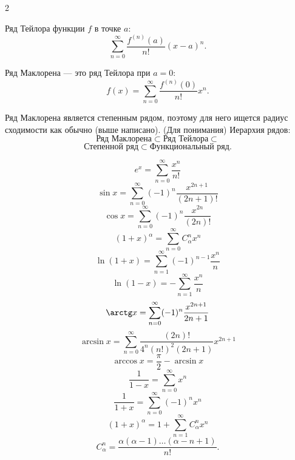 \begin{multicols}{2}
\begin{definition}
    Ряд Тейлора функции $f$ в точке $a$:
    \[
        \sum_{n=0}^{\infty}
        \frac{f^{(n)}(a)}{n!}(x-a)^n.
    \]
\end{definition}


\begin{definition}
    Ряд Маклорена --- это ряд Тейлора при $a = 0$:
    \[
        f(x)
        =
        \sum_{n=0}^{\infty}
        \frac{f^{(n)}(0)}{n!}x^n.
    \]
\end{definition}

\begin{remark}
    Ряд Маклорена является степенным рядом, поэтому для него ищется радиус сходимости как обычно (выше написано).
    (Для понимания) Иерархия рядов:
    \[
        \text{Ряд Маклорена}
        \subset
        \text{Ряд Тейлора} \subset
    \]
    \[
        \text{Степенной ряд}
        \subset
        \text{Функциональный ряд}.
    \]
\end{remark}

\begin{hint}
    \[
        e^x = \sum_{n=0}^{\infty} \frac{x^n}{n!}
    \]
    \[
        \sin x = \sum_{n=0}^{\infty} (-1)^n \frac{x^{2n+1}}{(2n+1)!}
    \]
    \[
        \cos x = \sum_{n=0}^{\infty} (-1)^n \frac{x^{2n}}{(2n)!}
    \]
    \[
        (1+x)^{\alpha}
        =
        \sum_{n=0}^{\infty}
        C_{\alpha}^{n}x^n
    \]
    \[
        \ln(1+x)
        =
        \sum_{n=1}^{\infty}
        (-1)^{n-1}\frac{x^n}{n}
    \]
    \[
        \ln(1-x)
        =
        -\sum_{n=1}^{\infty}
        \frac{x^n}{n}
    \]
    \[
        \arctg x
        =
        \sum_{n=0}^{\infty}
        (-1)^n\frac{x^{2n+1}}{2n+1}
    \]
    \[
        \arcsin x
        =
        \sum_{n=0}^{\infty}
        \frac{(2n)!}{4^n(n!)^2(2n+1)}x^{2n+1}
    \]
    \[
        \arccos x = \frac{\pi}{2} - \arcsin x
    \]
    \[
        \frac{1}{1-x}
        =
        \sum_{n=0}^{\infty}x^n
    \]
    \[
        \frac{1}{1+x}
        =
        \sum_{n=0}^{\infty}(-1)^n x^n
    \]
    \[
        (1+x)^{\alpha}
        =
        1 + \sum_{n=1}^{\infty} C_{\alpha}^{n}x^n
    \]
    \[
        C_{\alpha}^{n}
        =
        \frac{\alpha(\alpha-1)\ldots(\alpha-n+1)}{n!}.
    \]


\end{hint}


\end{multicols}